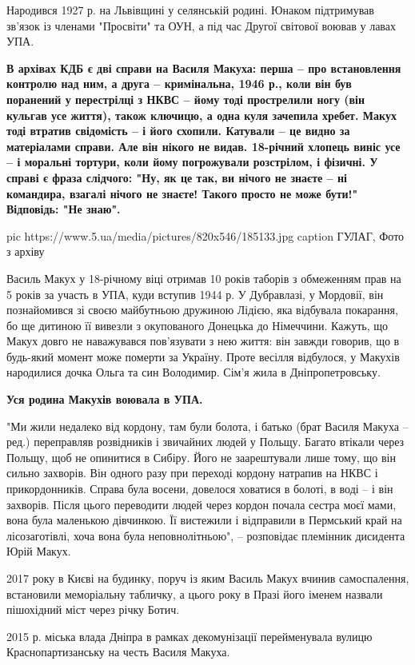 Народився 1927 р. на Львівщині у селянській родині. Юнаком підтримував
зв'язок із членами "Просвіти" та ОУН, а під час Другої світової воював у
лавах УПА.

{\bfseries
В архівах КДБ є дві справи на Василя Макуха: перша – про встановлення
контролю над ним, а друга – кримінальна, 1946 р., коли він був поранений
у перестрілці з НКВС – йому тоді прострелили ногу (він кульгав усе
життя), також ключицю, а одна куля зачепила хребет. Макух тоді втратив
свідомість – і його схопили. Катували – це видно за матеріалами справи.
Але він нікого не видав. 18-річний хлопець виніс усе – і моральні
тортури, коли йому погрожували розстрілом, і фізичні. У справі є фраза
слідчого: "Ну, як це так, ви нічого не знаєте – ні командира, взагалі
нічого не знаєте! Такого просто не може бути!" Відповідь: "Не знаю".
}

\ifcmt
pic https://www.5.ua/media/pictures/820x546/185133.jpg
caption ГУЛАГ, Фото з архіву
\fi

Василь Макух у 18-річному віці отримав 10 років таборів з обмеженням прав
на 5 років за участь в УПА, куди вступив 1944 р. У Дубравлазі, у Мордовії,
він познайомився зі своєю майбутньою дружиною Лідією, яка відбувала
покарання, бо ще дитиною її вивезли з окупованого Донецька до Німеччини.
Кажуть, що Макух довго не наважувався пов'язувати з нею життя: він завжди
говорив, що в будь-який момент може померти за Україну. Проте весілля
відбулося, у Макухів народилися дочка Ольга та син Володимир. Сім'я жила в
Дніпропетровську.

\textbf{Уся родина Макухів воювала в УПА.}

"Ми жили недалеко від кордону, там були болота, і батько (брат Василя
Макуха – ред.) переправляв розвідників і звичайних людей у Польщу. Багато
втікали через Польщу, щоб не опинитися в Сибіру. Його не заарештували лише
тому, що він сильно захворів. Він одного разу при переході кордону
натрапив на НКВС і прикордонників. Справа була восени, довелося ховатися в
болоті, в воді – і він захворів. Після цього переводити людей через кордон
почала сестра моєї мами, вона була маленькою дівчинкою. Її вистежили і
відправили в Пермський край на лісозаготівлі, хоча вона була
неповнолітньою", – розповідає племінник дисидента Юрій Макух.

2017 року в Києві на будинку, поруч із яким Василь Макух вчинив
самоспалення, встановили меморіальну табличку, а цього року в Празі його
іменем назвали пішохідний міст через річку Ботич.

2015 р. міська влада Дніпра в рамках декомунізації перейменувала вулицю
Краснопартизанську на честь Василя Макуха.

